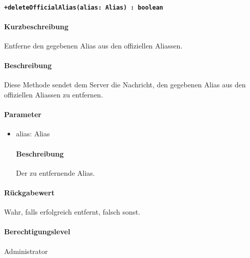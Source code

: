 \paragraph{\texttt{+deleteOfficialAlias(alias: Alias) : boolean}}%
\paragraph*{Kurzbeschreibung}
Entferne den gegebenen Alias aus den offiziellen Aliassen.
\paragraph*{Beschreibung}
Diese Methode sendet dem Server die Nachricht, den gegebenen Alias aus den offiziellen Aliassen zu entfernen.
\paragraph*{Parameter}
\begin{itemize}
    \item alias: Alias
            \paragraph*{Beschreibung}
            Der zu entfernende Alias.
\end{itemize}
\paragraph*{Rückgabewert}
Wahr, falls erfolgreich entfernt, falsch sonst.
\paragraph*{Berechtigungslevel}
Administrator